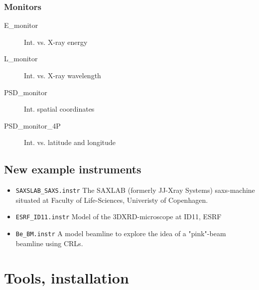 \subsubsection*{Monitors}
\begin{description}
\item[E\_monitor] Int. vs. X-ray energy
\item[L\_monitor] Int. vs. X-ray wavelength
\item[PSD\_monitor] Int. spatial coordinates
\item[PSD\_monitor\_4P] Int. vs. latitude and longitude
\end{description}


\subsection{New example instruments}


\begin{itemize}
\item \verb+SAXSLAB_SAXS.instr+ The SAXLAB (formerly JJ-Xray Systems) saxs-machine situated at Faculty of Life-Sciences, Univeristy of Copenhagen. 
\item \verb+ESRF_ID11.instr+ Model of the 3DXRD-microscope at ID11, ESRF
\item \verb+Be_BM.instr+ A model beamline to explore the idea of a "pink"-beam beamline using CRLs\cite{vaughan2011x}.
\end{itemize}


\section{Tools, installation}
\label{s:new-features:tools}
